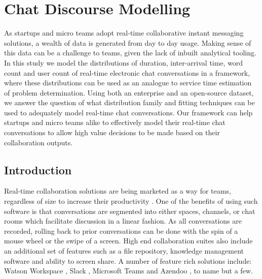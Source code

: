 
\chapter{Chat Discourse Modelling} %
\label{ch:CDM}

\begin{textsl}
{\small As startups and micro teams adopt real-time collaborative instant messaging solutions, a wealth of data is generated from day to day usage. Making sense of this data can be a challenge to teams, given the lack of inbuilt analytical tooling. In this study we model the distributions of duration, inter-arrival time, word count and user count of real-time electronic chat conversations in a framework, where these distributions can be used as an analogue to service time estimation of problem determination. Using both an enterprise and an open-source dataset, we answer the question of what distribution family and fitting techniques can be used to adequately model real-time chat conversations. Our framework can help startups and micro teams alike to effectively model their real-time chat conversations to allow high value decisions to be made based on their collaboration outputs.}
\end{textsl}

\vspace*{1cm}




\section{Introduction}
Real-time collaboration solutions are being marketed as a way for teams, regardless of size to increase their productivity \cite{SmartCollab} \cite{eightbiz} \cite{slackSME}. One of the benefits of using such software is that conversations are segmented into either spaces, channels, or chat rooms which facilitate discussion in a linear fashion. As all conversations are recorded, rolling back to prior conversations can be done with the spin of a mouse wheel or the swipe of a screen. High end collaboration suites also include an additional set of features such as a file repository, knowledge management software and ability to screen share.  A number of feature rich solutions include: Watson Workspace \cite{WatWork}, Slack \cite{Slack}, Microsoft Teams \cite{MSTeams} and Azendoo \cite{Azendo}, to name but a few.  

